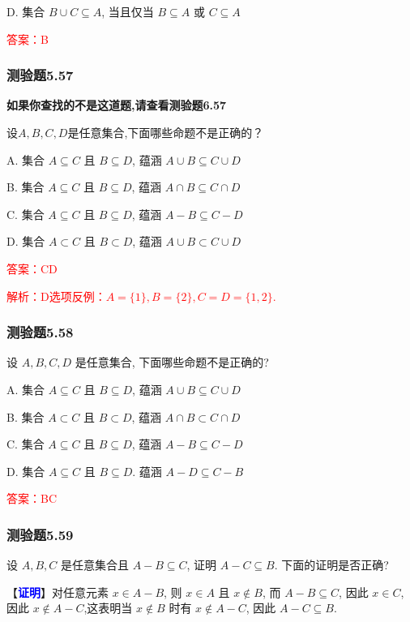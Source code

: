 \documentclass[UTF8, heading=true]{ctexart}
\begin{document}
D. 集合 $B \cup C \subseteq A$, 当且仅当 $B \subseteq A$ 或 $C \subseteq A$

\textcolor{red}{答案：B}



\subsubsection{测验题5.57}

\textbf{如果你查找的不是这道题,请查看测验题6.57}

设$A, B, C, D$是任意集合,下面哪些命题不是正确的？

A. 集合 $A \subseteq C$ 且 $B \subseteq D$, 蕴涵 $A \cup B \subseteq C \cup D$

B. 集合 $A \subseteq C$ 且 $B \subseteq D$, 蕴涵 $A \cap B \subseteq C \cap D$

C. 集合 $A \subseteq C$ 且 $B \subseteq D$, 蕴涵 $A-B \subseteq C-D$

D. 集合 $A \subset C$ 且 $B \subset D$, 蕴涵 $A \cup B \subset C \cup D$


\textcolor{red}{答案：CD}

\textcolor{red}{解析：D选项反例：$A=\{1\},B=\{2\},C=D=\{1,2\}$.}

\subsubsection{测验题5.58}
设 $A, B, C, D$ 是任意集合, 下面哪些命题不是正确的?

A. 
集合 $A \subseteq C$ 且 $B \subseteq D$, 蕴涵 $A \cup B \subseteq C \cup D$

B. 
集合 $A \subset C$ 且 $B \subset D$, 蕴涵 $A \cap B \subset C \cap D$

C. 
集合 $A \subseteq C$ 且 $B \subseteq D$, 蕴涵 $A-B \subseteq C-D$

D. 
集合 $A \subseteq C$ 且 $B \subseteq D$. 蕴涵 $A-D \subseteq C-B$

\textcolor{red}{答案：BC}

\subsubsection{测验题5.59}

设 $A, B, C$ 是任意集合且 $A-B \subseteq C$, 证明 $A-C \subseteq B$. 下面的证明是否正确?

【\textcolor{blue}{\textbf{证明}}】对任意元素 $x \in A-B$, 则 $x \in A$ 且 $x \notin B$, 而 $A-B \subseteq C$, 因此 $x \in C$, 因此 $x \notin A-C$,这表明当 $x \notin B$ 时有 $x \notin A-C$, 因此 $A-C \subseteq B$.
\end{document}
